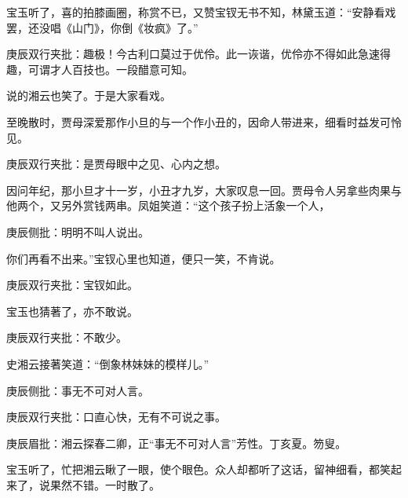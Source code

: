 \begin{parag}


    宝玉听了，喜的拍膝画圈，称赏不已，又赞宝钗无书不知，林黛玉道：“安静看戏罢，还没唱《山门》，你倒《妆疯》了。”\begin{note}庚辰双行夹批：趣极！今古利口莫过于优伶。此一诙谐，优伶亦不得如此急速得趣，可谓才人百技也。一段醋意可知。\end{note}说的湘云也笑了。于是大家看戏。
\end{parag}


\begin{parag}


    至晚散时，贾母深爱那作小旦的与一个作小丑的，因命人带进来，细看时益发可怜见。\begin{note}庚辰双行夹批：是贾母眼中之见、心内之想。\end{note}因问年纪，那小旦才十一岁，小丑才九岁，大家叹息一回。贾母令人另拿些肉果与他两个，又另外赏钱两串。凤姐笑道：“这个孩子扮上活象一个人，\begin{note}庚辰侧批：明明不叫人说出。\end{note}你们再看不出来。”宝钗心里也知道，便只一笑，不肯说。\begin{note}庚辰双行夹批：宝钗如此。\end{note}宝玉也猜著了，亦不敢说。\begin{note}庚辰双行夹批：不敢少。\end{note}史湘云接著笑道：“倒象林妹妹的模样儿。”\begin{note}庚辰侧批：事无不可对人言。\end{note}\begin{note}庚辰双行夹批：口直心快，无有不可说之事。\end{note}\begin{note}庚辰眉批：湘云探春二卿，正“事无不可对人言”芳性。丁亥夏。笏叟。\end{note}宝玉听了，忙把湘云瞅了一眼，使个眼色。众人却都听了这话，留神细看，都笑起来了，说果然不错。一时散了。
\end{parag}


